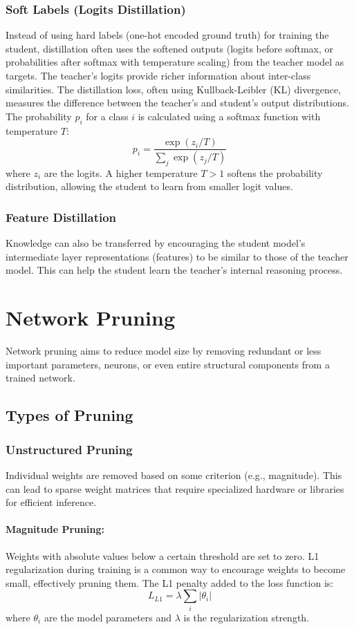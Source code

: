 \documentclass{article}
\begin{document}
\subsubsection{Soft Labels (Logits Distillation)}
Instead of using hard labels (one-hot encoded ground truth) for training the student, distillation often uses the softened outputs (logits before softmax, or probabilities after softmax with temperature scaling) from the teacher model as targets. The teacher's logits provide richer information about inter-class similarities.
The distillation loss, often using Kullback-Leibler (KL) divergence, measures the difference between the teacher's and student's output distributions.
The probability $p_i$ for a class $i$ is calculated using a softmax function with temperature $T$:
$$ p_i = \frac{\exp(z_i / T)}{\sum_j \exp(z_j / T)} $$
where $z_i$ are the logits. A higher temperature $T > 1$ softens the probability distribution, allowing the student to learn from smaller logit values.

\subsubsection{Feature Distillation}
Knowledge can also be transferred by encouraging the student model's intermediate layer representations (features) to be similar to those of the teacher model. This can help the student learn the teacher's internal reasoning process.

\section{Network Pruning}
Network pruning aims to reduce model size by removing redundant or less important parameters, neurons, or even entire structural components from a trained network.

\subsection{Types of Pruning}
\subsubsection{Unstructured Pruning}
Individual weights are removed based on some criterion (e.g., magnitude). This can lead to sparse weight matrices that require specialized hardware or libraries for efficient inference.
\paragraph{Magnitude Pruning:} Weights with absolute values below a certain threshold are set to zero. L1 regularization during training is a common way to encourage weights to become small, effectively pruning them. The L1 penalty added to the loss function is:
$$ L_{L1} = \lambda \sum_i |\theta_i| $$
where $\theta_i$ are the model parameters and $\lambda$ is the regularization strength.
\end{document}
